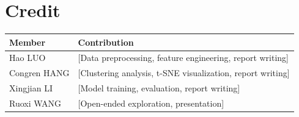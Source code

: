 \documentclass{article}
\begin{document}
\section*{Credit}

{
\footnotesize

\begin{tabular}{@{}ll@{}}
\toprule
Member & Contribution \\
\midrule
{Hao LUO} & [Data preprocessing, feature engineering, report writing] \\
{Congren HANG} & [Clustering analysis, t-SNE visualization, report writing] \\
{Xingjian LI} & [Model training, evaluation, report writing] \\
{Ruoxi WANG} & [Open-ended exploration, presentation] \\
\bottomrule
\end{tabular}
}
\end{document}
